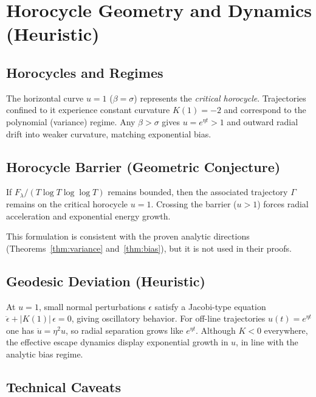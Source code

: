 \section{Horocycle Geometry and Dynamics (Heuristic)}\label{sec:horocycle}

\subsection{Horocycles and Regimes}

The horizontal curve $u=1$ ($\beta=\sigma$) represents the \emph{critical horocycle}.
Trajectories confined to it experience constant curvature $K(1)=-2$ and correspond
to the polynomial (variance) regime. Any $\beta>\sigma$ gives $u=e^{\eta t}>1$ and
outward radial drift into weaker curvature, matching exponential bias.

\subsection{Horocycle Barrier (Geometric Conjecture)}

\begin{conjecture*}
If $F_\lambda/(T\log T\log\log T)$ remains bounded, then the associated trajectory
$\Gamma$ remains on the critical horocycle $u=1$. Crossing the barrier ($u>1$)
forces radial acceleration and exponential energy growth.
\end{conjecture*}

This formulation is consistent with the proven analytic directions
(Theorems~\ref{thm:variance} and~\ref{thm:bias}), but it is not used in their proofs.

\subsection{Geodesic Deviation (Heuristic)}

At $u=1$, small normal perturbations $\epsilon$ satisfy a Jacobi-type equation
$\ddot{\epsilon}+|K(1)|\,\epsilon=0$, giving oscillatory behavior. For off-line
trajectories $u(t)=e^{\eta t}$ one has $\ddot{u}=\eta^2 u$, so radial separation
grows like $e^{\eta t}$. Although $K<0$ everywhere, the effective escape dynamics
display exponential growth in $u$, in line with the analytic bias regime.

\subsection{Technical Caveats}

